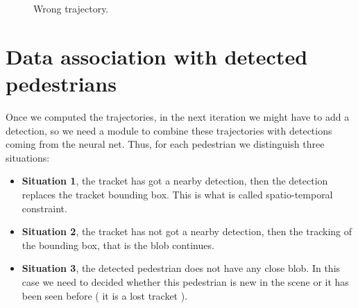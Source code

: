 \begin{figure}[H]
		
\centering

\\
\\
\caption{Wrong trajectory.}
\label{motion2nocoorrect}
\end{figure}





\section{Data association with detected pedestrians}

Once we computed the trajectories, in the next iteration we might have to add a detection, so we need a module to combine these trajectories with detections coming from the neural net. Thus, for each pedestrian we distinguish three situations:

\begin{itemize}



\item \textbf{Situation 1}, the tracket has got a nearby detection, then the detection replaces the tracket bounding box. This is what is called spatio-temporal constraint.

\item \textbf{Situation 2}, the tracket has not got a nearby detection, then the tracking of the bounding box, that is the blob continues.

\item \textbf{Situation 3}, the detected pedestrian does not have any close blob. In this case we need to decided whether this pedestrian is new in the scene or it has been seen before ( it is a lost tracket ).

\end{itemize}

